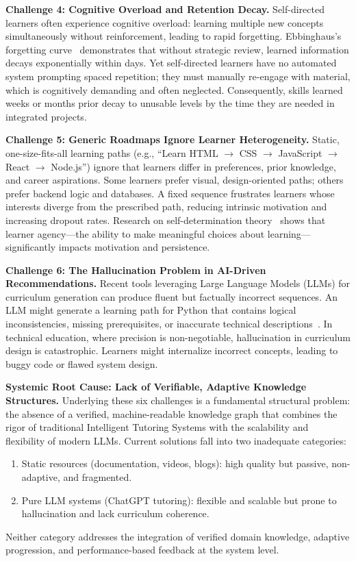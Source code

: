 \textbf{Challenge 4: Cognitive Overload and Retention Decay.} Self-directed learners often experience cognitive overload: learning multiple new concepts simultaneously without reinforcement, leading to rapid forgetting. Ebbinghaus's forgetting curve~\cite{ebbinghaus1885} demonstrates that without strategic review, learned information decays exponentially within days. Yet self-directed learners have no automated system prompting spaced repetition; they must manually re-engage with material, which is cognitively demanding and often neglected. Consequently, skills learned weeks or months prior decay to unusable levels by the time they are needed in integrated projects.

\textbf{Challenge 5: Generic Roadmaps Ignore Learner Heterogeneity.} Static, one-size-fits-all learning paths (e.g., \enquote{Learn HTML $\rightarrow$ CSS $\rightarrow$ JavaScript $\rightarrow$ React $\rightarrow$ Node.js}) ignore that learners differ in preferences, prior knowledge, and career aspirations. Some learners prefer visual, design-oriented paths; others prefer backend logic and databases. A fixed sequence frustrates learners whose interests diverge from the prescribed path, reducing intrinsic motivation and increasing dropout rates. Research on self-determination theory~\cite{ryan2000, deci1985} shows that learner agency---the ability to make meaningful choices about learning---significantly impacts motivation and persistence.

\textbf{Challenge 6: The Hallucination Problem in AI-Driven Recommendations.} Recent tools leveraging Large Language Models (LLMs) for curriculum generation can produce fluent but factually incorrect sequences. An LLM might generate a learning path for Python that contains logical inconsistencies, missing prerequisites, or inaccurate technical descriptions~\cite{marcus2020, weidinger2021}. In technical education, where precision is non-negotiable, hallucination in curriculum design is catastrophic. Learners might internalize incorrect concepts, leading to buggy code or flawed system design.

\textbf{Systemic Root Cause: Lack of Verifiable, Adaptive Knowledge Structures.} Underlying these six challenges is a fundamental structural problem: the absence of a verified, machine-readable knowledge graph that combines the rigor of traditional Intelligent Tutoring Systems with the scalability and flexibility of modern LLMs. Current solutions fall into two inadequate categories:
\begin{enumerate}
    \item Static resources (documentation, videos, blogs): high quality but passive, non-adaptive, and fragmented.
    \item Pure LLM systems (ChatGPT tutoring): flexible and scalable but prone to hallucination and lack curriculum coherence.
\end{enumerate}
Neither category addresses the integration of verified domain knowledge, adaptive progression, and performance-based feedback at the system level.

